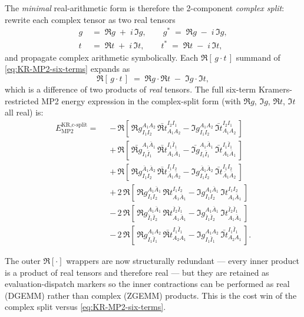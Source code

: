 \documentclass[11pt,oneside]{book}
\begin{document}
The \emph{minimal} real-arithmetic form is therefore the 2-component
\emph{complex split}: rewrite each complex tensor as two real tensors
\begin{align}
    g \;&=\; \Re g \;+\; i\,\Im g,
    \qquad
    g^{*} \;=\; \Re g \;-\; i\,\Im g, \\
    t \;&=\; \Re t \;+\; i\,\Im t,
    \qquad
    t^{*} \;=\; \Re t \;-\; i\,\Im t,
\end{align}
and propagate complex arithmetic symbolically. Each
$\Re[\,g\cdot t\,]$ summand of \cref{eq:KR-MP2-six-terms} expands as
\begin{equation}
    \Re\!\left[\, g \cdot t \,\right] \;=\;
        \Re g \cdot \Re t \;-\; \Im g \cdot \Im t,
    \label{eq:csplit-Re-product}
\end{equation}
which is a difference of two products of \emph{real} tensors. The full
six-term Kramers-restricted MP2 energy expression in the
complex-split form (with $\Re g$, $\Im g$, $\Re t$, $\Im t$ all real)
is:
\begin{align}
    E_{\text{MP2}}^{\text{KR,c-split}} =\;\;
    & -\,\Re\!\left[\,
        \Re g^{A_1 A_2}_{I_1 I_2}\,
        \bar{\Re t}^{I_2 I_1}_{A_1 A_2}
      - \Im g^{A_1 A_2}_{I_1 I_2}\,
        \bar{\Im t}^{I_2 I_1}_{A_1 A_2}
      \,\right] \nonumber\\
    & +\,\Re\!\left[\,
        \bar{\Re g}^{A_1 \bar{A}_1}_{I_1 \bar{I}_1}\,
        \bar{\Re t}^{I_1 \bar{I}_1}_{A_1 \bar{A}_1}
      - \bar{\Im g}^{A_1 \bar{A}_1}_{I_1 \bar{I}_1}\,
        \bar{\Im t}^{I_1 \bar{I}_1}_{A_1 \bar{A}_1}
      \,\right] \nonumber\\
    & +\,\Re\!\left[\,
        \Re g^{\bar{A}_1 \bar{A}_2}_{I_1 I_2}\,
        \bar{\Re t}^{I_1 I_2}_{\bar{A}_1 \bar{A}_2}
      - \Im g^{\bar{A}_1 \bar{A}_2}_{I_1 I_2}\,
        \bar{\Im t}^{I_1 I_2}_{\bar{A}_1 \bar{A}_2}
      \,\right] \nonumber\\
    & +\,2\,\Re\!\left[\,
        \Re g^{A_1 \bar{A}_1}_{I_1 I_2}\,
        \Re t^{I_1 I_2}_{A_1 \bar{A}_1}
      - \Im g^{A_1 \bar{A}_1}_{I_1 I_2}\,
        \Im t^{I_1 I_2}_{A_1 \bar{A}_1}
      \,\right] \nonumber\\
    & -\,2\,\Re\!\left[\,
        \Re g^{A_1 \bar{A}_1}_{\bar{I}_1 \bar{I}_2}\,
        \Re t^{\bar{I}_2 \bar{I}_1}_{A_1 \bar{A}_1}
      - \Im g^{A_1 \bar{A}_1}_{\bar{I}_1 \bar{I}_2}\,
        \Im t^{\bar{I}_2 \bar{I}_1}_{A_1 \bar{A}_1}
      \,\right] \nonumber\\
    & -\,2\,\Re\!\left[\,
        \Re g^{A_1 A_2}_{I_1 \bar{I}_1}\,
        \bar{\Re t}^{I_1 \bar{I}_1}_{A_2 A_1}
      - \Im g^{A_1 A_2}_{I_1 \bar{I}_1}\,
        \bar{\Im t}^{I_1 \bar{I}_1}_{A_2 A_1}
      \,\right] .
    \label{eq:KR-MP2-csplit}
\end{align}

The outer $\Re[\cdot]$ wrappers are now structurally redundant ---
every inner product is a product of real tensors and therefore real
--- but they are retained as evaluation-dispatch markers so the inner
contractions can be performed as real (DGEMM) rather than complex
(ZGEMM) products. This is the cost win of the complex split versus
\cref{eq:KR-MP2-six-terms}.
\end{document}
